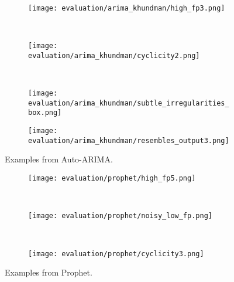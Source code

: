 \begin{figure}[htp!]
    \begin{subfigure}[b]{\linewidth}
        \centering
        \texttt{[image: evaluation/arima\_khundman/high\_fp3.png]}
        \label{fig:arima-fp}
    \end{subfigure}%
    \\
    \begin{subfigure}[b]{\linewidth}
        \centering
        \texttt{[image: evaluation/arima\_khundman/cyclicity2.png]}
        \label{fig:arima-cyclicity}
    \end{subfigure}
    \\
    \begin{subfigure}[b]{\linewidth}
        \centering
        \texttt{[image: evaluation/arima\_khundman/subtle\_irregularities\_box.png]}
        \label{fig:arima-subtle}
    \end{subfigure}
\end{figure}
\begin{figure}[htp!]
    \ContinuedFloat{}
    \begin{subfigure}[b]{\linewidth}
        \centering
        \texttt{[image: evaluation/arima\_khundman/resembles\_output3.png]}
        \label{fig:arima-resembles}
    \end{subfigure}
    \caption{Examples from Auto-ARIMA.}\label{fig:arima-output}
\end{figure}

\begin{figure}[htp!]
    \begin{subfigure}[b]{\linewidth}
        \centering
        \texttt{[image: evaluation/prophet/high\_fp5.png]}
        \label{fig:prophet-fp}
    \end{subfigure}%
    \\
    \begin{subfigure}[b]{\linewidth}
        \centering
        \texttt{[image: evaluation/prophet/noisy\_low\_fp.png]}
        \label{fig:prophet-curvy}
    \end{subfigure}
    \\
    \begin{subfigure}[b]{\linewidth}
        \centering
        \texttt{[image: evaluation/prophet/cyclicity3.png]}
        \label{fig:prophet-cyclicity}
    \end{subfigure}
\caption{Examples from Prophet.}\label{fig:prophet-output}
\end{figure}
\clearpage

